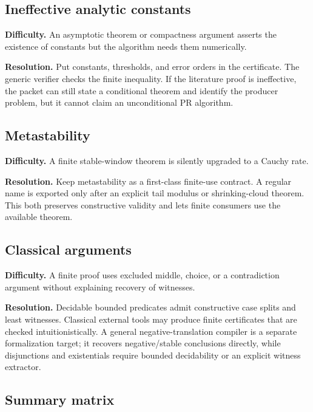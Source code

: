 \subsection{Ineffective analytic constants}

\textbf{Difficulty.}  An asymptotic theorem or compactness argument asserts the existence of constants but the algorithm needs them numerically.

\textbf{Resolution.}  Put constants, thresholds, and error orders in the certificate.  The generic verifier checks the finite inequality.  If the literature proof is ineffective, the packet can still state a conditional theorem and identify the producer problem, but it cannot claim an unconditional PR algorithm.

\subsection{Metastability}

\textbf{Difficulty.}  A finite stable-window theorem is silently upgraded to a Cauchy rate.

\textbf{Resolution.}  Keep metastability as a first-class finite-use contract.  A regular name is exported only after an explicit tail modulus or shrinking-cloud theorem.  This both preserves constructive validity and lets finite consumers use the available theorem.

\subsection{Classical arguments}

\textbf{Difficulty.}  A finite proof uses excluded middle, choice, or a contradiction argument without explaining recovery of witnesses.

\textbf{Resolution.}  Decidable bounded predicates admit constructive case splits and least witnesses.  Classical external tools may produce finite certificates that are checked intuitionistically.  A general negative-translation compiler is a separate formalization target; it recovers negative/stable conclusions directly, while disjunctions and existentials require bounded decidability or an explicit witness extractor.

\subsection{Summary matrix}

